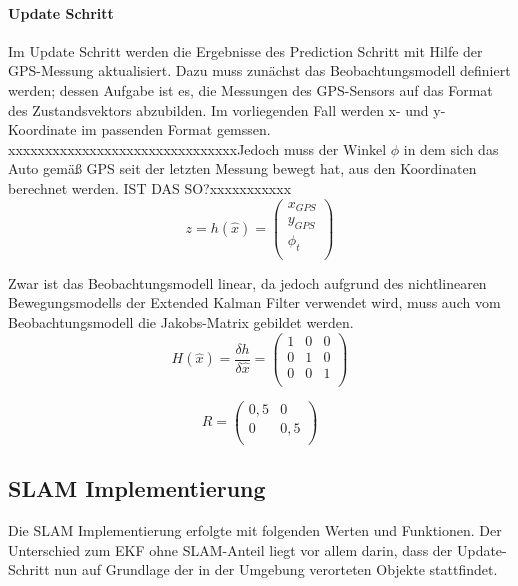 \documentclass[11pt]{article}
\begin{document}
\paragraph{Update Schritt}
Im Update Schritt werden die Ergebnisse des Prediction Schritt mit Hilfe der GPS-Messung aktualisiert. Dazu muss zunächst das Beobachtungsmodell definiert werden; dessen Aufgabe ist es, die Messungen des GPS-Sensors auf das Format des Zustandsvektors abzubilden. Im vorliegenden Fall werden x- und y-Koordinate im passenden Format gemssen. xxxxxxxxxxxxxxxxxxxxxxxxxxxxxxxJedoch muss der Winkel $\phi$ in dem sich das Auto gemäß GPS seit der letzten Messung bewegt hat, aus den Koordinaten berechnet werden. IST DAS SO?xxxxxxxxxxx
\begin{equation}\label{EKF-Observation-Model}
	z = h(\hat{x}) = \begin{pmatrix}
		x_{GPS} \\
		y_{GPS} \\
		\phi_t \\
	\end{pmatrix}
\end{equation}

Zwar ist das Beobachtungsmodell linear, da jedoch aufgrund des nichtlinearen Bewegungsmodells der Extended Kalman Filter verwendet wird, muss auch vom Beobachtungsmodell die Jakobs-Matrix gebildet werden. 
\begin{equation}\label{EKF-Observation-Model-Jakobs-Matrix}
	H(\hat{x})= \frac{\delta h}{\delta \hat{x}} = \begin{pmatrix}
		1 & 0 & 0 \\
		0 & 1 & 0 \\
		0 & 0 & 1 \\
	\end{pmatrix}
\end{equation}

\begin{equation}\label{GPS-Messungenauigkeits-Matrix}
	R = \begin{pmatrix}
		0,5 & 0 \\
		0 & 0,5 \\
	\end{pmatrix}
\end{equation}

\subsection{SLAM Implementierung}
Die SLAM Implementierung erfolgte mit folgenden Werten und Funktionen. Der Unterschied zum EKF ohne SLAM-Anteil liegt vor allem darin, dass der Update-Schritt nun auf Grundlage der in der Umgebung verorteten Objekte stattfindet.
\end{document}
